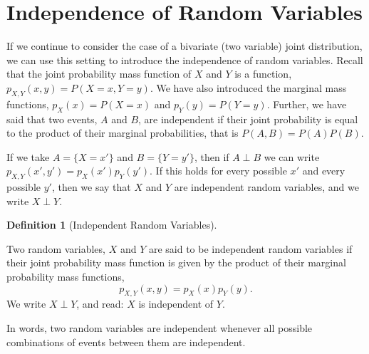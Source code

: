 \documentclass[
  letterpaper,
  DIV=11,
  numbers=noendperiod]{scrreprt}
\theoremstyle{definition}
\theoremstyle{definition}
\theoremstyle{definition}
\newtheorem{definition}{Definition}[chapter]
\theoremstyle{remark}
\begin{document}
\section{Independence of Random
Variables}\label{independence-of-random-variables}

If we continue to consider the case of a bivariate (two variable) joint
distribution, we can use this setting to introduce the independence of
random variables. Recall that the joint probability mass function of
\(X\) and \(Y\) is a function, \(p_{X,Y}(x,y) = P(X = x, Y = y)\). We
have also introduced the marginal mass functions, \(p_X(x) = P(X = x)\)
and \(p_Y(y) = P(Y = y)\). Further, we have said that two events, \(A\)
and \(B\), are independent if their joint probability is equal to the
product of their marginal probabilities, that is \(P(A,B) = P(A)P(B)\).

If we take \(A=\{X=x'\}\) and \(B=\{Y=y'\}\), then if \(A\perp B\) we
can write \(p_{X,Y}(x',y')=p_X(x')p_Y(y')\). If this holds for every
possible \(x'\) and every possible \(y'\), then we say that \(X\) and
\(Y\) are independent random variables, and we write \(X \perp Y\).

\begin{definition}[Independent Random
Variables]\protect\hypertarget{def-independent-rv}{}\label{def-independent-rv}

Two random variables, \(X\) and \(Y\) are said to be independent random
variables if their joint probability mass function is given by the
product of their marginal probability mass functions,
\[p_{X,Y}(x,y) = p_X(x)p_Y(y).\] We write \(X\perp Y\), and read: \(X\)
is independent of \(Y\).

\end{definition}

In words, two random variables are independent whenever all possible
combinations of events between them are independent.
\end{document}
